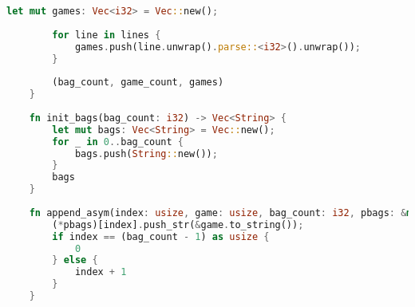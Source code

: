 \begin{lstlisting}[language=Rust, style=colouredRust]
        let mut games: Vec<i32> = Vec::new();
    
        for line in lines {
            games.push(line.unwrap().parse::<i32>().unwrap());
        }
    
        (bag_count, game_count, games)
    }
    
    fn init_bags(bag_count: i32) -> Vec<String> {
        let mut bags: Vec<String> = Vec::new();
        for _ in 0..bag_count {
            bags.push(String::new());
        }
        bags
    }
    
    fn append_asym(index: usize, game: usize, bag_count: i32, pbags: &mut Vec<String>) -> usize {
        (*pbags)[index].push_str(&game.to_string());
        if index == (bag_count - 1) as usize {
            0
        } else {
            index + 1
        }
    }
    
\end{lstlisting}
